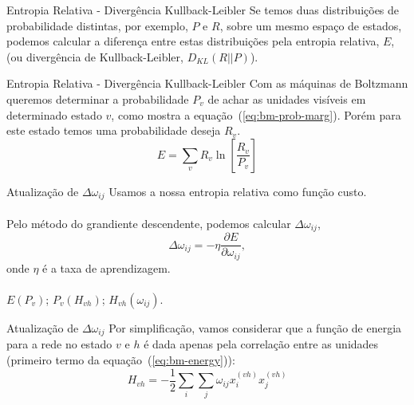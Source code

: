 \begin{frame}{Entropia Relativa - Divergência Kullback-Leibler}%
  \justifying%
  Se temos duas distribuições de probabilidade distintas, por exemplo, $P$ e $R$, sobre um mesmo espaço de estados, podemos calcular a diferença entre estas distribuições pela entropia relativa, $E$, (ou divergência de Kullback-Leibler, $D_{KL}(R||P)$).
\end{frame}
  
\begin{frame}{Entropia Relativa - Divergência Kullback-Leibler}%
  \justifying%
  Com as máquinas de Boltzmann queremos determinar a probabilidade $P_{v}$ de achar as unidades visíveis em determinado estado $v$, como mostra a equação~(\ref{eq:bm-prob-marg}). Porém para este estado temos uma probabilidade deseja $R_{v}$.
  \begin{equation}%
    \label{eq:bm-entropy}
    E = \sum_{v} R_{v} \ln \left[\frac{R_{v}}{P_{v}} \right]
  \end{equation}
\end{frame}

\begin{frame}{Atualização de $\Delta \omega_{ij}$}%
  \justifying%
  Usamos a nossa entropia relativa como função custo.
  \\~\\
  Pelo método do grandiente descendente, podemos calcular $\Delta \omega_{ij}$,
  \begin{equation}%
    \label{eq:omega-delta}
    \Delta \omega_{ij} = -\eta \frac{\partial E}{\partial \omega_{ij}},
  \end{equation}
  onde $\eta$ é a taxa de aprendizagem.
  \\~\\
  $E(P_{v})$; $P_{v}(H_{vh})$; $H_{vh}(\omega_{ij})$.
\end{frame} 

\begin{frame}{Atualização de $\Delta \omega_{ij}$}%
  \justifying%
  Por simplificação, vamos considerar que a função de energia para a rede no estado $v$ e $h$ é dada apenas pela correlação entre as unidades (primeiro termo da equação~(\ref{eq:bm-energy})):
  \begin{equation}%
    \label{eq:bm-energy-simple}
    H_{vh} = -\frac{1}{2} \sum_{i} \sum_{j} \omega_{ij} x^{(vh)}_{i} x^{(vh)}_{j}  
  \end{equation}
\end{frame}

